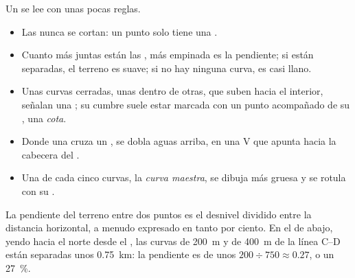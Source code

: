 Un  se lee con unas pocas reglas.
\begin{itemize}
  \item Las  nunca se cortan: un punto solo tiene una
        .
  \item Cuanto más juntas están las , más empinada es la
        pendiente; si están separadas, el terreno es suave; si no hay
        ninguna curva, es casi llano.
  \item Unas curvas cerradas, unas dentro de otras, que suben hacia el
        interior, señalan una ; su cumbre suele estar marcada con un
        punto acompañado de su , una \emph{cota}.
  \item Donde una  cruza un , se dobla aguas arriba, en
        una V que apunta hacia la cabecera del .
  \item Una de cada cinco curvas, la \emph{curva maestra}, se dibuja más
        gruesa y se rotula con su .
\end{itemize}

La pendiente del terreno entre dos puntos es el desnivel dividido entre la
distancia horizontal, a menudo expresado en tanto por ciento. En el 
de abajo, yendo hacia el norte desde el , las curvas de \qty{200}{m} y
de \qty{400}{m} de la línea C--D están separadas unos \qty{0.75}{km}: la
pendiente es de unos $200 \div 750
\approx 0.27$, o un \qty{27}{\%}.

